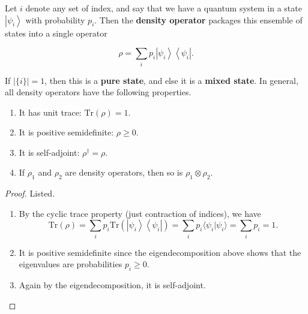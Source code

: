 \documentclass{article}
\newcommand{\ket}[1]{\ensuremath{\left|#1\right\rangle}}
\newcommand{\bra}[1]{\ensuremath{\left\langle#1\right|}}
\newcounter{definition}[section]
\begin{document}
    \begin{definition}
      \label{def:density-operator}
      Let $i$ denote any set of index, and say that we have a quantum system in a state $\ket{\psi_i}$ with probability $p_i$. Then the \textbf{density operator} packages this ensemble of states into a single operator

        \begin{equation}
          \rho = \sum_i p_i \ket{\psi_i} \bra{\psi_i}.
        \end{equation}

      If $|\{i\}| = 1$, then this is a \textbf{pure state}, and else it is a \textbf{mixed state}. In general, all density operators have the following properties. 
      \begin{enumerate}
        \item It has unit trace: $\text{Tr}(\rho) = 1$.
        \item It is positive semidefinite: $\rho \geq 0$.
        \item It is self-adjoint: $\rho^\dagger = \rho$.
        \item If $\rho_1$ and $\rho_2$ are density operators, then so is $\rho_1 \otimes \rho_2$. 
      \end{enumerate}
    \end{definition}
    \begin{proof} 
      Listed. 
      \begin{enumerate} 
        \item By the cyclic trace property (just contraction of indices), we have 
          \begin{equation} 
            \text{Tr}(\rho) = \sum_i p_i \text{Tr}(\ket{\psi_i} \bra{\psi_i}) = \sum_i p_i \langle \psi_i | \psi_i \rangle = \sum_i p_i = 1.
          \end{equation}
        \item It is positive semidefinite since the eigendecomposition above shows that the eigenvalues are probabilities $p_i \geq 0$. 
        \item Again by the eigendecomposition, it is self-adjoint. 
      \end{enumerate}
    \end{proof}
\end{document}
